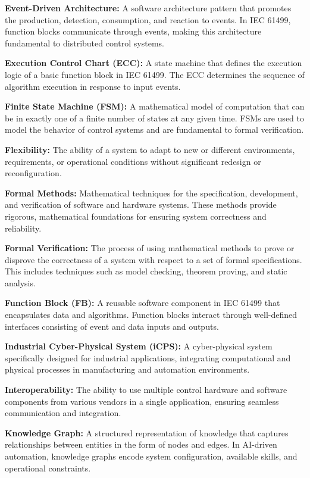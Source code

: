 \textbf{Event-Driven Architecture:} A software architecture pattern that promotes the production, detection, consumption, and reaction to events. In IEC 61499, function blocks communicate through events, making this architecture fundamental to distributed control systems.

\textbf{Execution Control Chart (ECC):} A state machine that defines the execution logic of a basic function block in IEC 61499. The ECC determines the sequence of algorithm execution in response to input events.

\textbf{Finite State Machine (FSM):} A mathematical model of computation that can be in exactly one of a finite number of states at any given time. FSMs are used to model the behavior of control systems and are fundamental to formal verification.

\textbf{Flexibility:} The ability of a system to adapt to new or different environments, requirements, or operational conditions without significant redesign or reconfiguration.

\textbf{Formal Methods:} Mathematical techniques for the specification, development, and verification of software and hardware systems. These methods provide rigorous, mathematical foundations for ensuring system correctness and reliability.

\textbf{Formal Verification:} The process of using mathematical methods to prove or disprove the correctness of a system with respect to a set of formal specifications. This includes techniques such as model checking, theorem proving, and static analysis.

\textbf{Function Block (FB):} A reusable software component in IEC 61499 that encapsulates data and algorithms. Function blocks interact through well-defined interfaces consisting of event and data inputs and outputs.

\textbf{Industrial Cyber-Physical System (iCPS):} A cyber-physical system specifically designed for industrial applications, integrating computational and physical processes in manufacturing and automation environments.

\textbf{Interoperability:} The ability to use multiple control hardware and software components from various vendors in a single application, ensuring seamless communication and integration.

\textbf{Knowledge Graph:} A structured representation of knowledge that captures relationships between entities in the form of nodes and edges. In AI-driven automation, knowledge graphs encode system configuration, available skills, and operational constraints.

